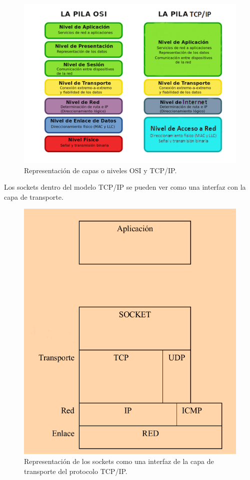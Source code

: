 \begin{figure}[H]
  \begin{center}
    \includegraphics[scale=0.8]{imagenes/osi-tcp.png}
  \end{center}
  \caption{ Representación de capas o niveles OSI y TCP/IP.}
  \label{diagram:modelo-osi-tcp}
\end{figure}

Los sockets dentro del modelo TCP/IP se pueden ver como una interfaz con la capa de transporte.


\begin{figure}[H]
  \begin{center}
    \includegraphics[scale=0.5]{imagenes/modelo-tcp-ip-socket.png}
  \end{center}
  \caption{ Representación de los sockets como una interfaz de la capa de transporte del protocolo TCP/IP.}
  \label{diagram:socket}
\end{figure}


